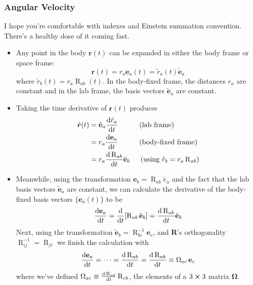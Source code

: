 \documentclass[11pt, a4paper]{article}
\newcommand{\e}{\mathbf{e}} %
\newcommand{\mat}[1]{\mathbf{#1}} %
\begin{document}
\subsubsection{Angular Velocity}
I hope you're comfortable with indexes and Einstein summation convention. There's a healthy dose of it coming fast.
\begin{itemize}
	\item Any point in the body $ \bm{r}(t) $ can be expanded in either the body frame or space frame:
	\begin{equation*}
		\bm{r}(t) = r_{a} \e_{a}(t) = \tilde{r}_{a}(t) \tilde{\e}_{a}
	\end{equation*}
	where $ \tilde{r}_{b}(t) = r_{a}\operatorname{R}_{ab}(t)$. In the body-fixed frame, the distances $ r_{a} $ are constant and in the lab frame, the basis vectors $ \tilde{\e}_{a} $ are constant. 
	
	\item Taking the time derivative of $ \bm{r}(t) $ produces
	\begin{align*}
		\dot{\bm{r}}(t) &=  \tilde{\e}_{a} \dv{\tilde{r}_{a}}{t} \quad \qquad \text{(lab frame)}\\
		&= r_{a} \dv{\e_{a}}{t} \quad \qquad \text{(body-fixed frame)} \\
		&=  r_{a}  \dv{\operatorname{R}_{ab}}{t} \tilde{\e}_{b} \quad \ \left(\text{using }  \tilde{r}_{b} = r_{a}\operatorname{R}_{ab}\right)
	\end{align*}

	\item Meanwhile, using the transformation $ \e_{b} = \operatorname{R}_{ab}\tilde{e}_{a} $ and the fact that the lab basis vectors $ \tilde{\e}_{a} $ are constant, we can calculate the derivative of the body-fixed basis vectors $ \{\e_{a}(t) \} $ to be
	\begin{equation*}
		\dv{\e_{a}}{t} = \dv{}{t}[\operatorname{R}_{ab} \tilde{\e}_{b}] = \dv{\operatorname{R}_{ab}}{t} \tilde{\e}_{b} 
	\end{equation*}
	Next, using the transformation $ \tilde{\e}_{b} = \operatorname{R}^{-1}_{bc}\e_{c} $,  and $ \mat{R} $'s orthogonality $ \operatorname{R}_{ij}^{-1}= \operatorname{R}_{ji} $ we finish the calculation with
	\begin{equation*}
		\dv{\e_{a}}{t} = \cdots =  \dv{\operatorname{R}_{ab}}{t} (\operatorname{R}^{-1}_{bc} \e_{c}) = \dv{\operatorname{R}_{ab}}{t} (\operatorname{R}_{cb} \e_{c}) \equiv \operatorname{\Omega}_{ac} \e_{c}
	\end{equation*}
	where we've defined $ \operatorname{\Omega}_{ac}\equiv \dv{\operatorname{R}_{ab}}{t} \operatorname{R}_{cb}$, the elements of a $ 3 \cross 3 $ matrix $ \mat{\Omega} $.
	

\end{itemize}
\end{document}
